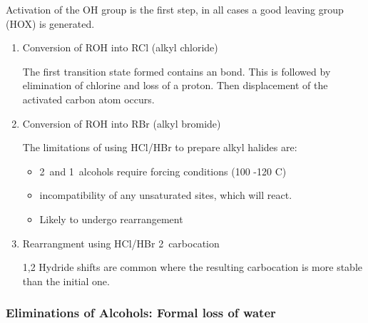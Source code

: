Activation of the OH group is the first step, in all cases a good leaving group
(HOX) is generated.

\begin{enumerate}[label=\alph*)]

  \item Conversion of ROH into RCl (alkyl chloride)


    The first transition state formed contains an  bond. This
    is followed by elimination of chlorine and loss of a proton. Then
     displacement of the activated carbon atom occurs.

  \item Conversion of ROH into RBr (alkyl bromide)


    The limitations of using HCl/HBr to prepare alkyl halides are:

    \begin{itemize}

      \item 2\de\ and 1\de\ alcohols require forcing conditions (100
        -120 \de C)

      \item incompatibility of any unsaturated sites, which will react.

      \item Likely to undergo rearrangement

    \end{itemize}

  \item Rearrangment using HCl/HBr 2\de\ carbocation


    1,2 Hydride shifts are common where the resulting carbocation is more
    stable than the initial one.

\end{enumerate}

\subsubsection{Eliminations of Alcohols: Formal loss of water}

